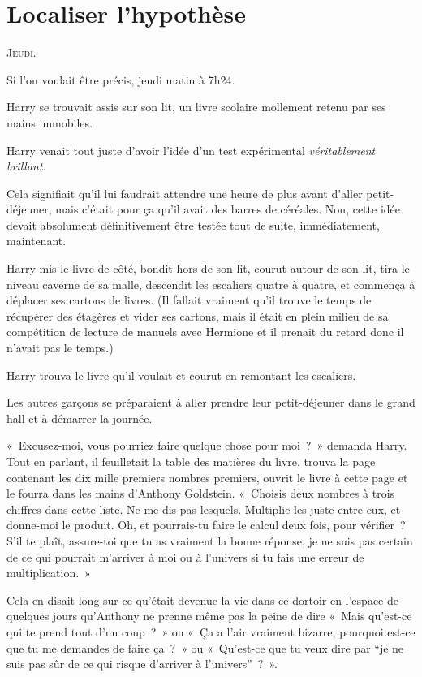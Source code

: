 
\chapter{Localiser l'hypothèse}

\lettrine{J}{eudi}.

\hplettrineextrapara
Si l'on voulait être précis, jeudi matin à 7h24.

Harry se trouvait assis sur son lit, un livre scolaire mollement retenu par ses mains immobiles.

Harry venait tout juste d'avoir l'idée d'un test expérimental \emph{véritablement brillant}.

Cela signifiait qu'il lui faudrait attendre une heure de plus avant d'aller petit-déjeuner, mais c'était pour ça qu'il avait des barres de céréales.
Non, cette idée devait absolument définitivement être testée tout de suite, immédiatement, maintenant.

Harry mis le livre de côté, bondit hors de son lit, courut autour de son lit, tira le niveau caverne de sa malle, descendit les escaliers quatre à quatre, et commença à déplacer ses cartons de livres.
(Il fallait vraiment qu'il trouve le temps de récupérer des étagères et vider ses cartons, mais il était en plein milieu de sa compétition de lecture de manuels avec Hermione et il prenait du retard donc il n'avait pas le temps.)

Harry trouva le livre qu'il voulait et courut en remontant les escaliers.

Les autres garçons se préparaient à aller prendre leur petit-déjeuner dans le grand hall et à démarrer la journée.

«~Excusez-moi, vous pourriez faire quelque chose pour moi~?~»
demanda Harry.
Tout en parlant, il feuilletait la table des matières du livre, trouva la page contenant les dix mille premiers nombres premiers, ouvrit le livre à cette page et le fourra dans les mains d'Anthony Goldstein.
«~Choisis deux nombres à trois chiffres dans cette liste.
Ne me dis pas lesquels.
Multiplie-les juste entre eux, et donne-moi le produit.
Oh, et pourrais-tu faire le calcul deux fois, pour vérifier~?
S'il te plaît, assure-toi que tu as vraiment la bonne réponse, je ne suis pas certain de ce qui pourrait m'arriver à moi ou à l'univers si tu fais une erreur de multiplication.~»

Cela en disait long sur ce qu'était devenue la vie dans ce dortoir en l'espace de quelques jours qu'Anthony ne prenne même pas la peine de dire
«~Mais qu'est-ce qui te prend tout d'un coup~?~»
ou
«~Ça a l'air vraiment bizarre, pourquoi est-ce que tu me demandes de faire ça~?~»
ou
«~Qu'est-ce que tu veux dire par “je ne suis pas sûr de ce qui risque d'arriver à l'univers”~?~».

